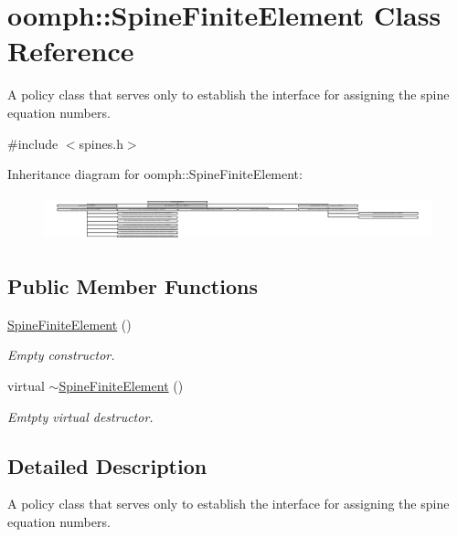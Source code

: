 \hypertarget{classoomph_1_1SpineFiniteElement}{}\section{oomph\+:\+:Spine\+Finite\+Element Class Reference}
\label{classoomph_1_1SpineFiniteElement}


A policy class that serves only to establish the interface for assigning the spine equation numbers.  




{\ttfamily \#include $<$spines.\+h$>$}

Inheritance diagram for oomph\+:\+:Spine\+Finite\+Element\+:\begin{figure}[H]
\begin{center}
\leavevmode
\includegraphics[height=1.333333cm]{classoomph_1_1SpineFiniteElement}
\end{center}
\end{figure}
\subsection*{Public Member Functions}
\begin{DoxyCompactItemize}
\item 
\hyperlink{classoomph_1_1SpineFiniteElement_a1f6114f8f71ac42cfdd92c94666f53ad}{Spine\+Finite\+Element} ()
\begin{DoxyCompactList}\small\item\em Empty constructor. \end{DoxyCompactList}\item 
virtual \hyperlink{classoomph_1_1SpineFiniteElement_afdb60867f13f454011a3e628faf41b64}{$\sim$\+Spine\+Finite\+Element} ()
\begin{DoxyCompactList}\small\item\em Emtpty virtual destructor. \end{DoxyCompactList}\end{DoxyCompactItemize}


\subsection{Detailed Description}
A policy class that serves only to establish the interface for assigning the spine equation numbers. 

